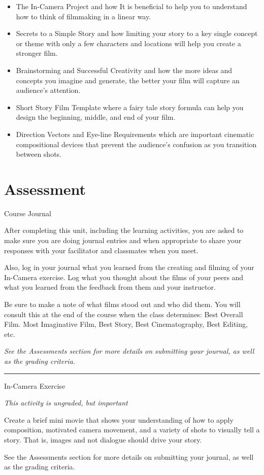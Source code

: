 \documentclass[
]{book}
\begin{document}
\begin{itemize}
\item
  The In-Camera Project and how It is beneficial to help you to understand how to think of filmmaking in a linear way.
\item
  Secrets to a Simple Story and how limiting your story to a key single concept or theme with only a few characters and locations will help you create a stronger film.
\item
  Brainstorming and Successful Creativity and how the more ideas and concepts you imagine and generate, the better your film will capture an audience's attention.
\item
  Short Story Film Template where a fairy tale story formula can help you design the beginning, middle, and end of your film.
\item
  Direction Vectors and Eye-line Requirements which are important cinematic compositional devices that prevent the audience's confusion as you transition between shots.
\end{itemize}

\hypertarget{assessment-11}{%
\section*{Assessment}\label{assessment-11}}

\begin{assessment}
{Course Journal}

After completing this unit, including the learning activities, you are asked to make sure you are doing journal entries and when appropriate to share your responses with your facilitator and classmates when you meet.

Also, log in your journal what you learned from the creating and filming of your In-Camera exercise. Log what you thought about the films of your peers and what you learned from the feedback from them and your instructor.

Be sure to make a note of what films stood out and who did them. You will consult this at the end of the course when the class determines: Best Overall Film. Most Imaginative Film, Best Story, Best Cinematography, Best Editing, etc.

\emph{See the Assessments section for more details on submitting your journal, as well as the grading criteria.}

\begin{center}\rule{0.5\linewidth}{0.5pt}\end{center}

{In-Camera Exercise}

\emph{This activity is ungraded, but important}

Create a brief mini movie that shows your understanding of how to apply composition, motivated camera movement, and a variety of shots to visually tell a story. That is, images and not dialogue should drive your story.

See the Assessments section for more details on submitting your journal, as well as the grading criteria.
\end{assessment}
\end{document}
